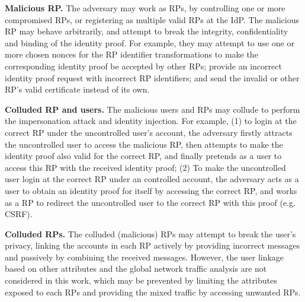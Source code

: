 \textbf{Malicious RP.} %
The adversary may work as RPs, by controlling one or more compromised RPs, or registering as multiple valid RPs at the IdP. 
The malicious RP may behave arbitrarily, and attempt to break the integrity, confidentiality and binding of the identity proof.
For example, they may attempt to use one or more chosen nonces for the RP  identifier transformations to make the corresponding identity proof be  accepted by other RPs;
provide an incorrect identity proof request with incorrect RP identifiers;
and send the invalid or other RP's valid certificate instead of its own. 


\textbf{Colluded RP and users.} The malicious users and RPs may collude to perform the impersonation attack and identity injection. 
For example, (1) to login at the correct RP under the uncontrolled user's account, the adversary firstly attracts the uncontrolled user to access the malicious RP, then attempts to make the identity proof also valid for the correct RP, and finally pretends as a user to access this RP with the received identity proof;
(2) To make the uncontrolled user login at the correct RP under an controlled account, the adversary acts as a user to obtain an identity proof for itself by accessing the correct RP, and works as a RP to redirect the uncontrolled user to the correct RP with this proof (e.g. CSRF).

\textbf{Colluded RPs.} The colluded (malicious) RPs may attempt to break the user's privacy, linking the accounts in each RP actively by providing incorrect messages
and passively by combining the received messages.
However, the user linkage based on other attributes and the global network traffic analysis are not considered in this work,
which may be prevented by limiting the attributes exposed to each RPs and providing the mixed traffic by accessing unwanted RPs.

